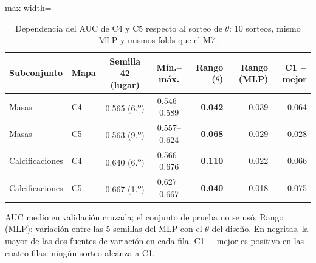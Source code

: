 \begin{table}[H]
\centering
\small
\caption{Dependencia del AUC de C4 y C5 respecto al sorteo de $\theta$: 10 sorteos, mismo MLP y mismos folds que el M7.}
\label{tab:x7_theta}
\begin{adjustbox}{max width=\linewidth}
\begin{tabular}{l l c c r r r}
\toprule
Subconjunto & Mapa & Semilla 42 (lugar) & Mín.--máx. & Rango ($\theta$) & Rango (MLP) & C1 $-$ mejor \\
\midrule
Masas & C4 & 0.565 (6.\textsuperscript{o}) & 0.546--0.589 & \textbf{0.042} & 0.039 & 0.064 \\
Masas & C5 & 0.563 (9.\textsuperscript{o}) & 0.557--0.624 & \textbf{0.068} & 0.029 & 0.028 \\
Calcificaciones & C4 & 0.640 (6.\textsuperscript{o}) & 0.566--0.676 & \textbf{0.110} & 0.022 & 0.066 \\
Calcificaciones & C5 & 0.667 (1.\textsuperscript{o}) & 0.627--0.667 & \textbf{0.040} & 0.018 & 0.075 \\
\bottomrule
\end{tabular}
\end{adjustbox}
\par\smallskip
\parbox{0.95\linewidth}{\footnotesize AUC medio en validación cruzada; el conjunto de prueba no se usó. Rango (MLP): variación entre las 5 semillas del MLP con el $\theta$ del diseño. En negritas, la mayor de las dos fuentes de variación en cada fila. C1 $-$ mejor es positivo en las cuatro filas: ningún sorteo alcanza a C1.}
\end{table}
